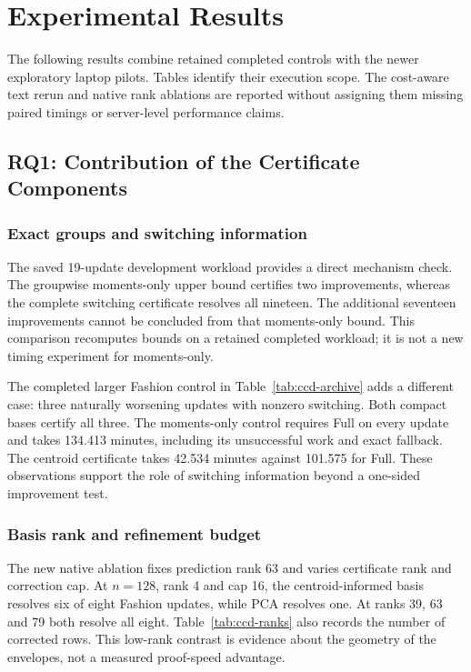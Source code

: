 \section{Experimental Results}
\label{sec:evaluation}
The following results combine retained completed controls with the newer
exploratory laptop pilots. Tables identify their execution scope. The
cost-aware text rerun and native rank ablations are reported without
assigning them missing paired timings or server-level performance claims.

\subsection{RQ1: Contribution of the Certificate Components}
\label{sec:ccd-rq1}
\subsubsection{Exact groups and switching information}
The saved 19-update development workload provides a direct mechanism check.
The groupwise moments-only upper bound certifies two improvements, whereas
the complete switching certificate resolves all nineteen. The additional
seventeen improvements cannot be concluded from that moments-only bound.
This comparison recomputes bounds on a retained completed workload; it is
not a new timing experiment for moments-only.

The completed larger Fashion control in Table~\ref{tab:ccd-archive} adds a
different case: three naturally worsening updates with nonzero switching.
Both compact bases certify all three. The moments-only control requires
Full on every update and takes 134.413 minutes, including its unsuccessful
work and exact fallback. The centroid certificate takes 42.534 minutes
against 101.575 for Full. These observations support the role of switching
information beyond a one-sided improvement test.


\subsubsection{Basis rank and refinement budget}
The new native ablation fixes prediction rank 63 and varies certificate rank
and correction cap. At $n=128$, rank 4 and cap 16, the centroid-informed basis
resolves six of eight Fashion updates, while PCA resolves one. At ranks 39,
63 and 79 both resolve all eight. Table~\ref{tab:ccd-ranks} also records the
number of corrected rows. This low-rank contrast is evidence about the
geometry of the envelopes, not a measured proof-speed advantage.


